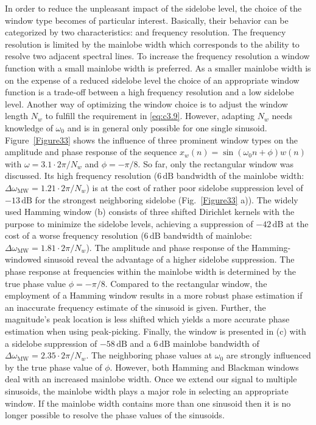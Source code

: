 \noindent In order to reduce the unpleasant impact of the sidelobe level, the choice of the window type becomes of particular interest. Basically, their behavior can be categorized by two characteristics:  and {frequency resolution}. The frequency resolution is limited by the mainlobe width which corresponds to the ability to resolve two adjacent spectral lines. To increase the frequency resolution a window function with a small mainlobe width is preferred. As a smaller mainlobe width is on the expense of a reduced sidelobe level the choice of an appropriate window function is a trade-off between a high frequency resolution and a low sidelobe level. Another way of optimizing the window choice is to adjust the window length $N_w$ to fulfill the requirement in \eqref{eq:c3.9}. However, adapting $N_w$ needs knowledge of $\omega_0$ and is in general only possible for one single sinusoid. \\

\noindent Figure~\ref{Figure33} shows the influence of three prominent window types on the amplitude and phase response of the sequence $x_w(n)=\sin(\omega_0 n+\phi)w(n)$ with $\omega=3.1\cdot 2\pi/N_w$ and $\phi=-\pi/8$. So far, only the rectangular window was discussed. Its high frequency resolution ($6\,\text{dB}$ bandwidth of the mainlobe width: $\Delta\omega_{\text{MW}}=1.21\cdot 2\pi/N_w$) is at the cost of rather poor sidelobe suppression level of $-13\,\text{dB}$ for the strongest neighboring sidelobe (Fig.~\ref{Figure33} a)). The widely used Hamming window (b) consists of three shifted Dirichlet kernels with the purpose to minimize the sidelobe levels, achieving a suppression of $-42\,\text{dB}$ at the cost of a worse frequency resolution ($6\,\text{dB}$ bandwidth of mainlobe: $\Delta\omega_{\text{MW}}=1.81\cdot 2\pi/N_w$). The amplitude and phase response of the Hamming-windowed sinusoid reveal the advantage of a higher sidelobe suppression. The phase response at frequencies within the mainlobe width
is determined by the true phase value $\phi=-\pi/8$.
Compared to the rectangular window, the employment of a Hamming window results in a more robust phase estimation if an inaccurate frequency estimate of the sinusoid is given. Further, the magnitude's peak location is less shifted which yields a more accurate phase estimation when using peak-picking. Finally, the  window is presented in (c) with a sidelobe suppression of $-58\,\text{dB}$ and a $6\,\text{dB}$ mainlobe bandwidth of $\Delta\omega_{\text{MW}}=2.35\cdot 2\pi/N_w$. The neighboring phase values at $\omega_0$ are strongly influenced by the true phase value of $\phi$. However, both Hamming and Blackman windows deal with an increased mainlobe width. Once we extend our signal to multiple sinusoids, the mainlobe width plays a major role in selecting an appropriate window. If the mainlobe width contains more than one sinusoid then it is no longer possible to resolve the phase values of the sinusoids.


